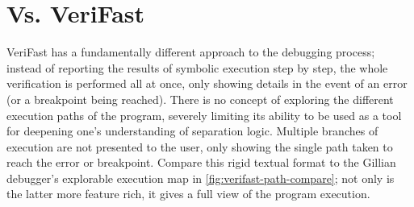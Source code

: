 \section{Vs. VeriFast}

VeriFast has a fundamentally different approach to the debugging process;
instead of reporting the results of symbolic execution step by step, the whole
verification is performed all at once, only showing details in the event of an
error (or a breakpoint being reached). There is no concept of exploring the
different execution paths of the program, severely limiting its ability to be
used as a tool for deepening one's understanding of separation logic. Multiple
branches of execution are not presented to the user, only showing the single
path taken to reach the error or breakpoint. Compare this rigid textual format
to the Gillian debugger's explorable execution map in
\autoref{fig:verifast-path-compare}; not only is the latter more feature rich,
it gives a full view of the program execution.

